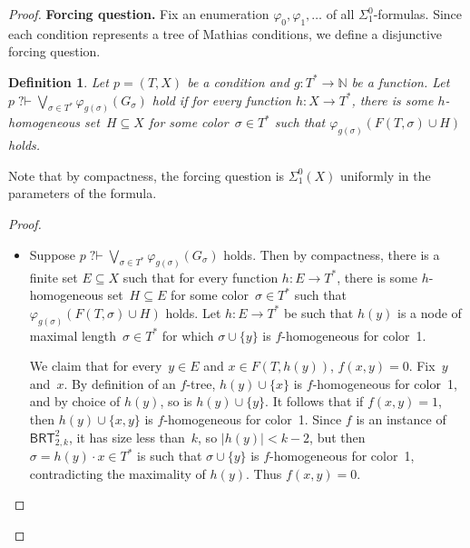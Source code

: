 \documentclass{article}
\newcommand{\qvdash}{\operatorname{{?}{\vdash}}}
\newcommand{\nqvdash}{\operatorname{{?}{\nvdash}}}
\newcommand{\BRT}[0]{\mathsf{BRT}}
\newcommand{\NN}[0]{\mathbb{N}}
\numberwithin{theorem}{section}
\newtheorem{lemma}[theorem]{Lemma}
\newtheorem{definition}[theorem]{Definition}
\begin{document}
\begin{proof}
\noindent
\textbf{Forcing question.}
Fix an enumeration $\varphi_0, \varphi_1, \dots$ of all $\Sigma^0_1$-formulas.
Since each condition represents a tree of Mathias conditions, we define a disjunctive forcing question.

\begin{definition}
Let $p = (T, X)$ be a condition and $g : T^* \to \NN$ be a function.
Let $p \qvdash \bigvee_{\sigma \in T^*} \varphi_{g(\sigma)}(G_\sigma)$ hold if for every function $h : X \to T^*$,
there is some $h$-homogeneous set~$H \subseteq X$ for some color~$\sigma \in T^*$ such that $\varphi_{g(\sigma)}(F(T, \sigma) \cup H)$ holds.
\end{definition}

Note that by compactness, the forcing question is $\Sigma^0_1(X)$ uniformly in the parameters of the formula.

\begin{proof}\ 
\begin{itemize}
    \item[(i)] Suppose $p \qvdash \bigvee_{\sigma \in T^*} \varphi_{g(\sigma)}(G_\sigma)$ holds. Then by compactness, there is a finite set $E \subseteq X$ such that for every function $h : E \to T^*$, there is some $h$-homogeneous set~$H \subseteq E$ for some color~$\sigma \in T^*$ such that $\varphi_{g(\sigma)}(F(T, \sigma) \cup H)$ holds. 
    Let $h : E \to T^*$ be such that $h(y)$ is a node of maximal length~$\sigma \in T^*$ for which $\sigma \cup \{y\}$ is $f$-homogeneous for color~1. 
    
    We claim that for every~$y \in E$ and $x \in F(T, h(y))$, $f(x, y) = 0$. Fix~$y$ and~$x$. By definition of an $f$-tree, $h(y) \cup \{x\}$ is $f$-homogeneous for color~1, and by choice of $h(y)$, so is $h(y) \cup \{y\}$. It follows that if $f(x, y) = 1$, then $h(y) \cup \{x, y\}$ is $f$-homogeneous for color~1. Since $f$ is an instance of $\BRT^2_{2,k}$, it has size less than~$k$, so $|h(y)| < k-2$, but then $\sigma = h(y) \cdot x \in T^*$ is such that $\sigma \cup \{y\}$ is $f$-homogeneous for color~1, contradicting the maximality of $h(y)$. Thus $f(x, y) = 0$.


\end{itemize}
\end{proof}
\end{proof}
\end{document}
